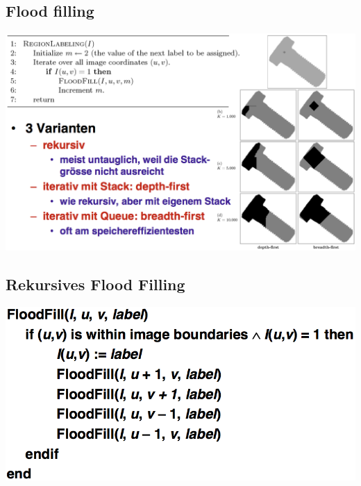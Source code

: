 \documentclass[10pt]{article}
\begin{document}
\subsection{Flood filling}
\begin{center}
	\includegraphics[scale=0.25]{flood_filling.png}
\end{center}

\subsection{Rekursives Flood Filling}
\begin{center}
	\includegraphics[scale=0.15]{rec_flood_filling.png}
\end{center}
\end{document}
